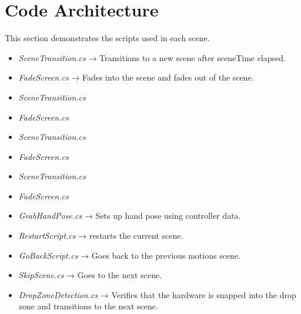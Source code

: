 \documentclass[10pt,twocolumn]{article}
\begin{document}
\appendix
\section{Code Architecture}
This section demonstrates the scripts used in each scene.\\

\begin{itemize}
    \textbf{Scene 0: Introduction Scene}\\
    \item \textit{SceneTransition.cs} → Transitions to a new scene after sceneTime elapsed.\\
    \item \textit{FadeScreen.cs} → Fades into the scene and fades out of the scene. 
\end{itemize}

\begin{itemize}
    \textbf{Scene 1: Overview Informational Scene}\\
    \item \textit{SceneTransition.cs}\\
    \item \textit{FadeScreen.cs}
\end{itemize}

\begin{itemize}
    \textbf{Scene 2:  Overview Diagram Scene}\\
    \item \textit{SceneTransition.cs}\\
    \item \textit{FadeScreen.cs}
\end{itemize}

\begin{itemize}
    \textbf{Scene 3:  Overview Diagram Scene}\\
    \item \textit{SceneTransition.cs}\\
    \item \textit{FadeScreen.cs}
\end{itemize}

\begin{itemize}
    \textbf{Scene 4:  CPU Placement Scene}\\
    \item \textit{GrabHandPose.cs} → Sets up hand pose using controller data.\\
    \item \textit{RestartScript.cs} → restarts the current scene.\\
    \item \textit{GoBackScript.cs} → Goes back to the previous motions scene.\\
    \item \textit{SkipScene.cs} → Goes to the next scene.\\
    \item \textit{DropZoneDetection.cs} → Verifies that the hardware is snapped into the drop zone and transitions to the next scene.
\end{itemize}
\end{document}
